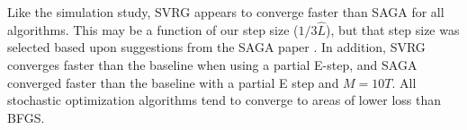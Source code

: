 %
Like the simulation study, SVRG appears to converge faster than SAGA for all algorithms. This may be a function of our step size ($1/3 \hat L$), but that step size was selected based upon suggestions from the SAGA paper \citep{Defazio:2014}. In addition, SVRG converges faster than the baseline when using a partial E-step, and SAGA converged faster than the baseline with a partial E step and $M=10T$. All stochastic optimization algorithms tend to converge to areas of lower loss than BFGS. 


